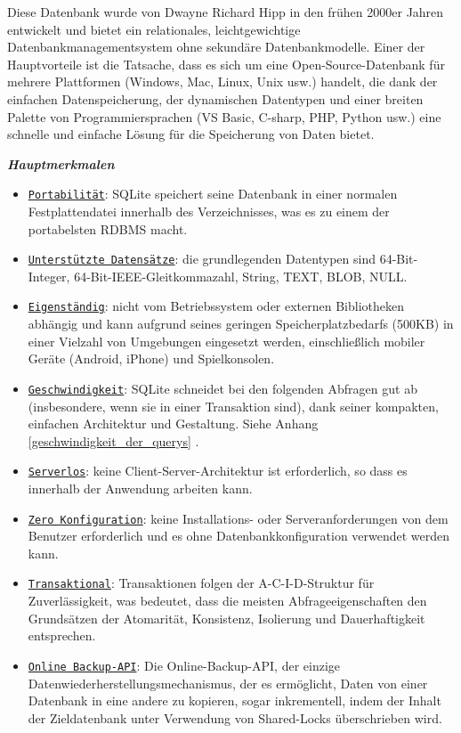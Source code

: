 Diese Datenbank wurde von Dwayne Richard Hipp in den frühen 2000er Jahren entwickelt und bietet ein relationales,
leichtgewichtige Datenbankmanagementsystem ohne sekundäre Datenbankmodelle. Einer der Hauptvorteile ist die Tatsache,
dass es sich um eine Open-Source-Datenbank für mehrere Plattformen (Windows, Mac, Linux, Unix usw.) handelt,
die dank der einfachen Datenspeicherung,
der dynamischen Datentypen und einer breiten Palette von Programmiersprachen (VS Basic, C-sharp, PHP, Python usw.)
eine schnelle und einfache Lösung für die Speicherung von Daten bietet.\cite{SQLite_wiki}


\begin{large} \emph{\textbf{Hauptmerkmalen}} \end{large}
\begin{itemize}
    \item \underline{\texttt{Portabilität}}:
        SQLite speichert seine Datenbank in einer normalen Festplattendatei 
        innerhalb des Verzeichnisses,
        was es zu einem der portabelsten RDBMS macht. \cite{Was_ist_SQLite}
    \item \underline{\texttt{Unterstützte Datensätze}}:
        die grundlegenden Datentypen sind 64-Bit-Integer, 64-Bit-IEEE-Gleitkommazahl,
        String, TEXT, BLOB, NULL. \cite{SQLite_datatypes}
    \item \underline{\texttt{Eigenständig}}:
        nicht vom Betriebssystem oder externen Bibliotheken abhängig und kann aufgrund seines geringen
        Speicherplatzbedarfs (500KB) in einer Vielzahl von Umgebungen eingesetzt werden, einschließlich 
        mobiler Geräte (Android, iPhone) und Spielkonsolen.\cite{SQLite_features}
    \item \underline{\texttt{Geschwindigkeit}}:
        SQLite schneidet bei den folgenden Abfragen gut ab (insbesondere, wenn sie in einer Transaktion sind),
        dank seiner kompakten, einfachen Architektur und Gestaltung. Siehe Anhang \ref{geschwindigkeit_der_querys} . \cite{SQLite_speed}
    \item \underline{\texttt{Serverlos}}:
        keine Client-Server-Architektur ist erforderlich, so dass es innerhalb der Anwendung arbeiten kann. \cite{SQLite_serverless}
    \item \underline{\texttt{Zero Konfiguration}}:
        keine Installations- oder Serveranforderungen von dem Benutzer erforderlich und es ohne Datenbankkonfiguration
        verwendet werden kann.\cite{SQLite_features}
    \item \underline{\texttt{Transaktional}}:
        Transaktionen folgen der A-C-I-D-Struktur für Zuverlässigkeit, was bedeutet, dass die meisten Abfrageeigenschaften
        den Grundsätzen der Atomarität, Konsistenz, Isolierung und Dauerhaftigkeit entsprechen.\cite{SQLite_features}  
    \item \underline{\texttt{Online Backup-API}}:
        Die Online-Backup-API, der einzige Datenwiederherstellungsmechanismus, der es ermöglicht, Daten von einer Datenbank
        in eine andere zu kopieren, sogar inkrementell, indem der Inhalt der Zieldatenbank unter Verwendung von Shared-Locks überschrieben wird.\cite{SQLite_backup}
\end{itemize} 
